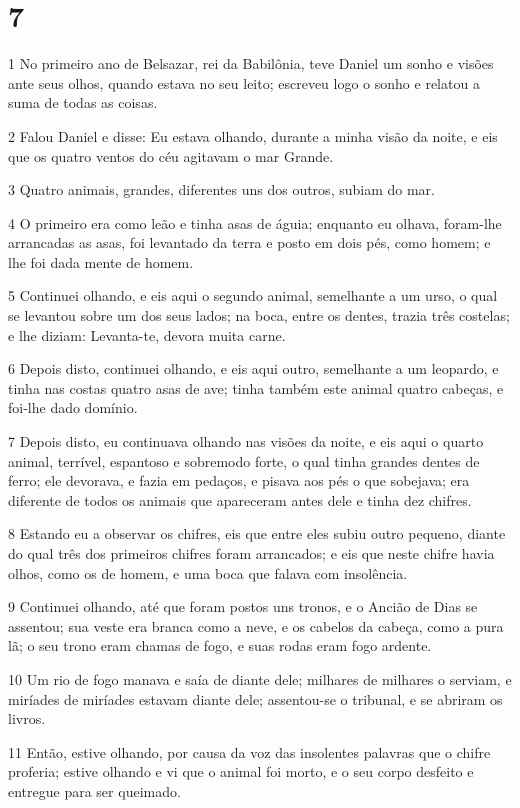 \chapter{7}

\par 1 No primeiro ano de Belsazar, rei da Babilônia, teve Daniel um sonho e visões ante seus olhos, quando estava no seu leito; escreveu logo o sonho e relatou a suma de todas as coisas.
\par 2 Falou Daniel e disse: Eu estava olhando, durante a minha visão da noite, e eis que os quatro ventos do céu agitavam o mar Grande.
\par 3 Quatro animais, grandes, diferentes uns dos outros, subiam do mar.
\par 4 O primeiro era como leão e tinha asas de águia; enquanto eu olhava, foram-lhe arrancadas as asas, foi levantado da terra e posto em dois pés, como homem; e lhe foi dada mente de homem.
\par 5 Continuei olhando, e eis aqui o segundo animal, semelhante a um urso, o qual se levantou sobre um dos seus lados; na boca, entre os dentes, trazia três costelas; e lhe diziam: Levanta-te, devora muita carne.
\par 6 Depois disto, continuei olhando, e eis aqui outro, semelhante a um leopardo, e tinha nas costas quatro asas de ave; tinha também este animal quatro cabeças, e foi-lhe dado domínio.
\par 7 Depois disto, eu continuava olhando nas visões da noite, e eis aqui o quarto animal, terrível, espantoso e sobremodo forte, o qual tinha grandes dentes de ferro; ele devorava, e fazia em pedaços, e pisava aos pés o que sobejava; era diferente de todos os animais que apareceram antes dele e tinha dez chifres.
\par 8 Estando eu a observar os chifres, eis que entre eles subiu outro pequeno, diante do qual três dos primeiros chifres foram arrancados; e eis que neste chifre havia olhos, como os de homem, e uma boca que falava com insolência.
\par 9 Continuei olhando, até que foram postos uns tronos, e o Ancião de Dias se assentou; sua veste era branca como a neve, e os cabelos da cabeça, como a pura lã; o seu trono eram chamas de fogo, e suas rodas eram fogo ardente.
\par 10 Um rio de fogo manava e saía de diante dele; milhares de milhares o serviam, e miríades de miríades estavam diante dele; assentou-se o tribunal, e se abriram os livros.
\par 11 Então, estive olhando, por causa da voz das insolentes palavras que o chifre proferia; estive olhando e vi que o animal foi morto, e o seu corpo desfeito e entregue para ser queimado.

